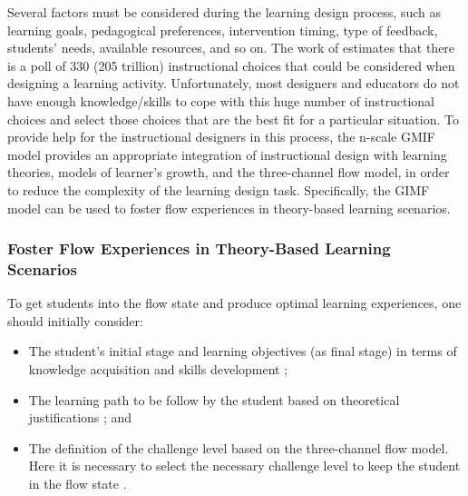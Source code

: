 Several factors must be considered during the learning design process, such as learning goals, pedagogical preferences, intervention timing, type of feedback, students’ needs, available resources, and so on. The work of  estimates that there is a poll of 330 (205 trillion) instructional choices that could be considered when designing a learning activity. Unfortunately, most designers and educators do not have enough knowledge/skills to cope with this huge number of instructional choices and select those choices that are the best fit for a particular situation. To provide help for the instructional designers in this process, the n-scale GMIF model provides an appropriate integration of instructional design with learning theories, models of learner’s growth, and the three-channel flow model, in order to reduce the complexity of the learning design task. Specifically, the GIMF model can be used to foster flow experiences in theory-based learning scenarios.

\subsubsection*{Foster Flow Experiences in Theory-Based Learning Scenarios}

To get students into the flow state and produce optimal learning experiences, one should initially consider: 

\begin{itemize}
\item The student's initial stage and learning objectives (as final stage) in terms of knowledge acquisition and skills development \cite{Anderson1982,RumelhartNorman1976};
\item The learning path to be follow by the student based on theoretical justifications \cite{IsotaniMizoguchiInabaIkeda2010,Romiszowski1981}; and 
\item The definition of the challenge level based on the three-channel flow model. Here it is necessary to select the necessary challenge level to keep the student in the flow state \cite{Csikszentmihalyi2014,D'Mello2012}. 
\end{itemize}

